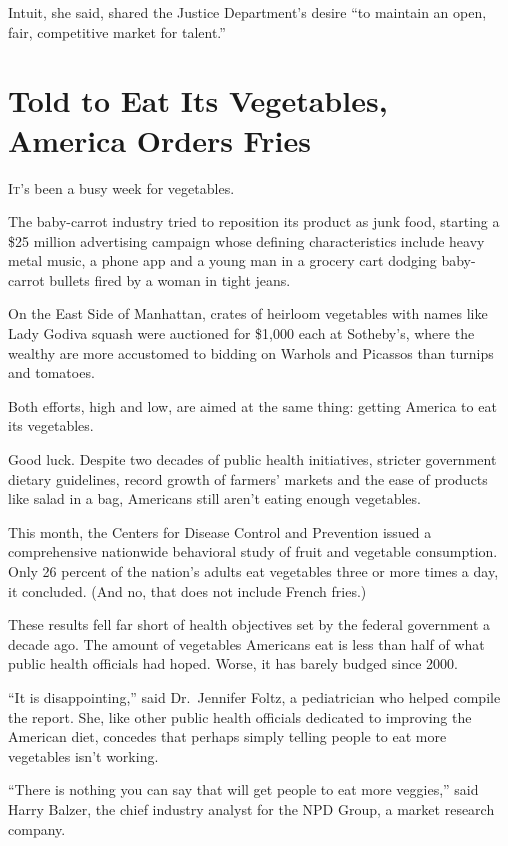 ﻿\documentclass[12pt]{article}
\begin{document}
Intuit, she said, shared the Justice Department's desire ``to maintain an open, fair, competitive
market for talent.''

\pagebreak
\section{Told to Eat Its Vegetables, America Orders Fries}

\lettrine{I}{t}'s been a busy week for vegetables.

The baby-carrot industry tried to reposition its product as junk food, starting a \$25 million
advertising campaign whose defining characteristics include heavy metal music, a phone app and a
young man in a grocery cart dodging baby-carrot bullets fired by a woman in tight jeans.

On the East Side of Manhattan, crates of heirloom vegetables with names like Lady Godiva squash were
auctioned for \$1,000 each at Sotheby's, where the wealthy are more accustomed to bidding on Warhols
and Picassos than turnips and tomatoes.

Both efforts, high and low, are aimed at the same thing: getting America to eat its vegetables.

Good luck. Despite two decades of public health initiatives, stricter government dietary guidelines,
record growth of farmers' markets and the ease of products like salad in a bag, Americans still
aren't eating enough vegetables.

This month, the Centers for Disease Control and Prevention issued a comprehensive nationwide
behavioral study of fruit and vegetable consumption. Only 26 percent of the nation's adults eat
vegetables three or more times a day, it concluded. (And no, that does not include French fries.)

These results fell far short of health objectives set by the federal government a decade ago. The
amount of vegetables Americans eat is less than half of what public health officials had hoped.
Worse, it has barely budged since 2000.

``It is disappointing,'' said Dr.~Jennifer Foltz, a pediatrician who helped compile the report. She,
like other public health officials dedicated to improving the American diet, concedes that perhaps
simply telling people to eat more vegetables isn't working.

``There is nothing you can say that will get people to eat more veggies,'' said Harry Balzer, the
chief industry analyst for the NPD Group, a market research company.
\end{document}
